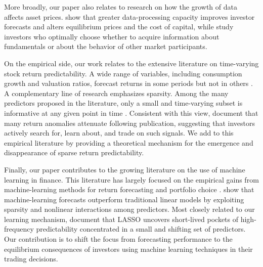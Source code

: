 More broadly, our paper also relates to research on how the growth of data affects asset prices. 
\citet{begenau2018big} show that greater data-processing capacity improves investor forecasts and alters equilibrium prices and the cost of capital, while \citet{farboodi2020long} study investors who optimally choose whether to acquire information about fundamentals or about the behavior of other market participants.

On the empirical side, our work relates to the extensive literature on time-varying stock return predictability. 
A wide range of variables, including consumption growth and valuation ratios, forecast returns in some periods but not in others \citep{AngBekaert2007RFS,GoyalWelch2003MS,LettauLudvigson2001JF}. 
A complementary line of research emphasizes sparsity.
Among the many predictors proposed in the literature, only a small and time-varying subset is informative at any given point in time \citep{kozak2020shrinking,freyberger2020dissecting}. 
Consistent with this view, \citet{Mclean2016} document that many return anomalies attenuate following publication, suggesting that investors actively search for, learn about, and trade on such signals.
We add to this empirical literature by providing a theoretical mechanism for the emergence and disappearance  of sparse return predictability.

Finally, our paper contributes to the growing literature on the use of machine learning in finance. 
This literature has largely focused on the empirical gains from machine-learning methods for return forecasting and portfolio choice \citep{Feng2020}. 
\citet{Gu2020} show that machine-learning forecasts outperform traditional linear models by exploiting sparsity and nonlinear interactions among predictors. 
Most closely related to our learning mechanism, \citet{Chinco2019} document that LASSO uncovers short-lived pockets of high-frequency predictability concentrated in a small and shifting set of predictors. 
Our contribution is to shift the focus from forecasting performance to the equilibrium consequences of investors using machine learning techniques in their trading decisions.


